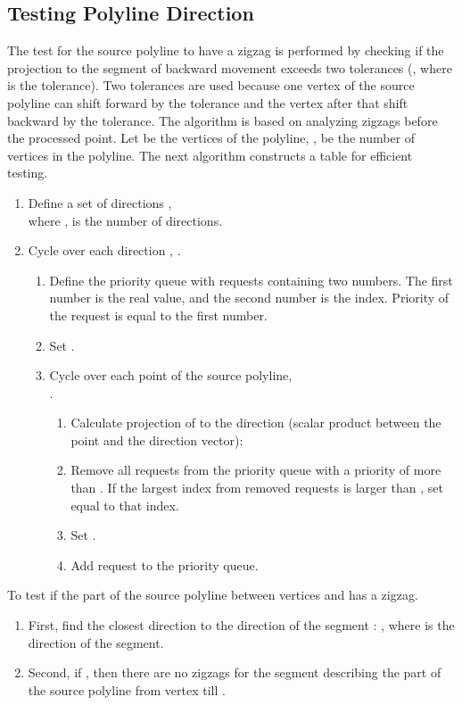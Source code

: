 \documentclass[conference]{IEEEtran}
\begin{document}
\subsection
{
  Testing Polyline Direction
  \label{sec:TestingZigZag}
}

The test for the source polyline to have a zigzag is performed by checking if the projection to the segment of backward movement exceeds two tolerances (, where  is the tolerance). Two tolerances are used because one vertex of the source polyline can shift forward by the tolerance and the vertex after that shift backward by the tolerance. The algorithm is based on analyzing zigzags before the processed point. Let  be the vertices of the polyline, ,  be the number of vertices in the polyline. The next algorithm constructs a table for efficient testing.
\begin{enumerate}[label={}]
  \item Define a set of directions ,\\
  where ,  is the number of directions.
  \item Cycle over each direction , .
  \begin{enumerate}[label={}]
    \item Define the priority queue with requests containing two numbers. The first number is the real value, and the second number is the index. Priority of the request is equal to the first number.
    \item Set .
    \item Cycle over each point  of the source polyline,\\
    .
    \begin{enumerate}[label={}]
      \item Calculate projection of  to the direction  (scalar product between the point and the direction vector):
      
      \item Remove all requests from the priority queue with a priority of more than . If the largest index from removed requests is larger than , set  equal to that index.
      \item Set .
      \item Add request  to the priority queue.
    \end{enumerate}
  \end{enumerate}
\end{enumerate}

To test if the part of the source polyline between vertices  and  has a zigzag.
\begin{enumerate}[label={}]
  \item First, find the closest direction  to the direction of the segment :
  ,
  where  is the direction of the segment.
  \item Second, if , then there are no zigzags for the segment describing the part of the source polyline from vertex  till .
\end{enumerate}
\end{document}
